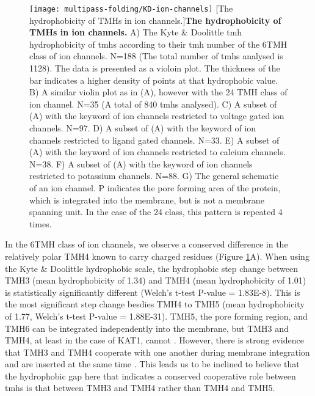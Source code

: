 \begin{figure}[!ht]
\centering
\texttt{[image: multipass-folding/KD-ion-channels]}
		[The hydrophobicity of TMHs in ion channels.]{\textbf{The hydrophobicity of TMHs in ion channels.}
    A) The Kyte \& Doolittle \gls{tmh} hydrophobicity of \gls{tmh}s according to their \gls{tmh} number of the 6TMH class of ion channels.
    N=188 (The total number of \gls{tmh}s analysed is 1128).
    The data is presented as a violoin plot.
    The thickness of the bar indicates a higher density of points at that hydrophobic value.
    B) A similar violin plot as in (A), however with the 24 TMH class of ion channel.
    N=35 (A total of 840 \gls{tmh}s analysed).
    C) A subset of (A) with the keyword of ion channels restricted to voltage gated ion channels.
    N=97.
    D) A subset of (A) with the keyword of ion channels restricted to ligand gated channels.
    N=33.
    E) A subset of (A) with the keyword of ion channels restricted to calcium channels.
    N=38.
    F) A subset of (A) with the keyword of ion channels restricted to potassium channels.
    N=88.
    G) The general schematic of an ion channel.
    P indicates the pore forming area of the protein, which is integrated into the membrane, but is not a membrane spanning unit.
    In the case of the 24 class, this pattern is repeated 4 times.
    }

\label{fig:KD-ion-channels}
\end{figure}

In the 6TMH class of ion channels, we observe a conserved difference in the relatively polar TMH4 known to carry charged residues (Figure \ref{fig:KD-ion-channels}A).
When using the Kyte \& Doolittle hydrophobic scale, the hydrophobic step change between TMH3 (mean hydrophobicity of 1.34) and TMH4 (mean hydrophobicity of 1.01) is statistically significantly different (Welch's t\--test P\--value = 1.83E-8).
This is the most significant step change besdies TMH4 to TMH5 (mean hydrophobicity of 1.77, Welch's t\--test P\--value = 1.88E-31).
TMH5, the pore forming region, and TMH6 can be integrated independently into the membrane, but TMH3 and TMH4, at least in the case of KAT1, cannot \cite{Sato2002}.
However, there is strong evidence that TMH3 and TMH4 cooperate with one another during membrane integration and are inserted at the same time \cite{Sato2002, Sato2003, Zhang2007, Cymer2015}.
This leads us to be inclined to believe that the hydrophobic gap here that indicates a conserved cooperative role between \gls{tmh}s is that between TMH3 and TMH4 rather than TMH4 and TMH5.



